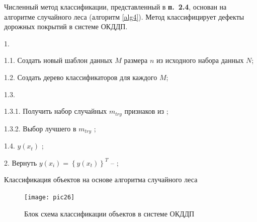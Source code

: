 Численный метод классификации, представленный в \textbf{п.~2.4}, основан на алгоритме случайного леса (алгоритм \ref{alg4}).  Метод классифицирует дефекты дорожных покрытий в системе ОКДДП.
\begin{algorithm}[ht!]
   1. 
     {
		1.1. Создать новый шаблон данных $M$ размера $n$ из исходного набора данных $N$;

		1.2. Создать дерево классификаторов для каждого $M$;

		1.3. 
     {
		  1.3.1. Получить набор случайных  $m_{try}$ признаков из ;

          1.3.2. Выбор лучшего  в $m_{try}$ ;
		}
		1.4. $y\left(x_t\right)$ ;
		}

		2. Вернуть $y\left(x_i\right) = \left\{y\left(x_t\right)\right\}^T$ -- ;

  \caption{Классификация объектов на основе алгоритма\protect{} случайного леса}\label{alg4}

\end{algorithm}


\begin{figure}[ht!]
\centering
\texttt{[image: pic26]}
\caption{Блок схема классификации\protect{} объектов в системе ОКДДП}
	\label{pic26}
\end{figure}

